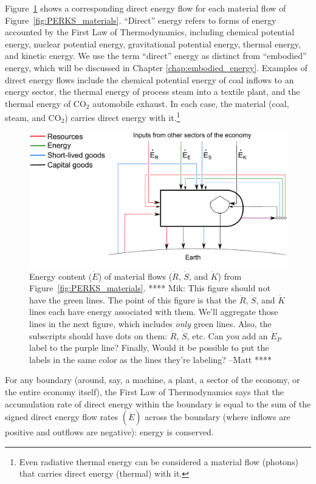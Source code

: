 Figure~\ref{fig:PERKS_energy_content} shows a corresponding 
direct energy flow for each material flow of Figure~\ref{fig:PERKS_materials}.
``Direct'' energy refers to forms of energy accounted by the First Law of Thermodynamics,
including chemical potential energy, 
nuclear potential energy, 
gravitational potential energy,
thermal energy, 
and kinetic energy.
We use the term ``direct'' energy as distinct from ``embodied'' energy, 
which will be discussed in Chapter \ref{chap:embodied_energy}.
Examples of direct energy flows include 
the chemical potential energy of coal inflows to an energy sector, 
the thermal energy of process steam into a textile plant, and
the thermal energy of CO$_2$ automobile exhaust.
In each case, the material (coal, steam, and CO$_2$) 
carries direct energy with it.\footnote{Even radiative thermal energy 
can be considered a material flow (photons) that carries
direct energy (thermal) with it.}


\begin{figure}[h!]
\centering
\includegraphics[width=0.8\linewidth]{Part_2/Chapter_Energy/images/PERKS_basic_unit_energy_content.pdf}
\caption{Energy content ($\dot{E}$) of material flows 
($\dot{R}$, $\dot{S}$, and $\dot{K}$) 
from Figure~\ref{fig:PERKS_materials}. 
**** Mik: This figure should not have the green lines. 
The point of this figure is that the $\dot{R}$, $\dot{S}$, and $\dot{K}$ lines 
each have energy associated with them. 
We'll aggregate those lines in the next figure, 
which includes \emph{only} green lines. 
Also, the subscripts should have dots on them: 
$\dot{R}$, $\dot{S}$, etc. 
Can you add an $\dot{E}_{\dot{P}}$ label to the purple line? 
Finally, Would it be possible to put the labels 
in the same color as the lines they're labeling? --Matt ****}
\label{fig:PERKS_energy_content}
\end{figure}

For any boundary (around, say, a machine, a plant,
a sector of the economy, or the entire economy itself), 
the First Law of Thermodynamics says that
the accumulation rate of direct energy within the boundary
is equal to the sum of the signed direct energy flow rates $\left( \dot{E} \right)$
across the boundary (where inflows are positive and outflows are negative): 
energy is conserved.

